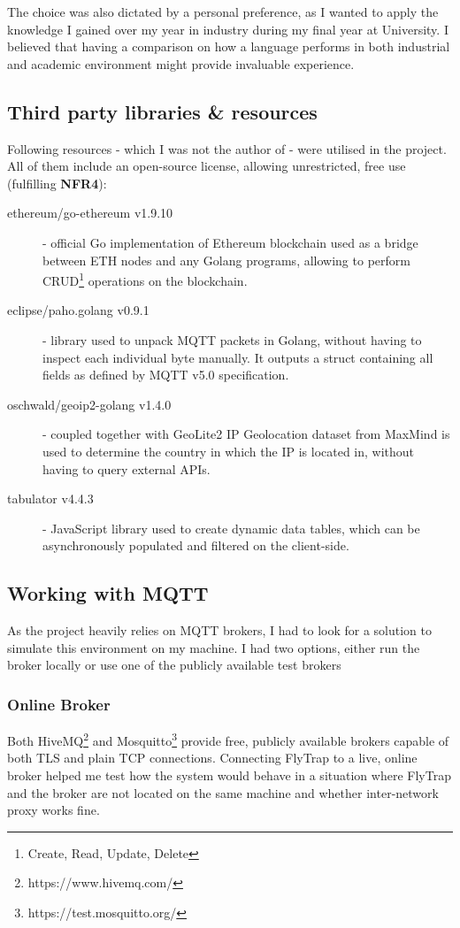 The choice was also dictated by a personal preference, as I wanted to apply the knowledge I gained over my year in industry during my final year at University. I believed that having a comparison on how a language performs in both industrial and academic environment might provide invaluable experience.
\subsection{Third party libraries \& resources}\label{sec:tpp}
Following resources - which I was not the author of - were utilised in the project. All of them include an open-source license, allowing unrestricted, free use (fulfilling \textbf{NFR4}):
\begin{description}
  \item[ethereum/go-ethereum v1.9.10] \cite{ethereum2017official} - official Go implementation of Ethereum blockchain used as a bridge between ETH nodes and any Golang programs, allowing to perform CRUD\footnote{Create, Read, Update, Delete} operations on the blockchain.
    \item[eclipse/paho.golang v0.9.1] \cite{pahogolang} - library used to unpack MQTT packets in Golang, without having to inspect each individual byte manually. It outputs a struct containing all fields as defined by MQTT v5.0 specification.
    \item[oschwald/geoip2-golang v1.4.0] \cite{geoip2} - coupled together with GeoLite2 IP Geolocation dataset from MaxMind \cite{maxmind} is used to determine the country in which the IP is located in, without having to query external APIs. 
    \item[tabulator v4.4.3] \cite{tabulator} - JavaScript library used to create dynamic data tables, which can be asynchronously populated and filtered on the client-side.
\end{description}

\subsection{Working with MQTT}
As the project heavily relies on MQTT brokers, I had to look for a solution to simulate this environment on my machine. I had two  options, either run the broker locally or use one of the publicly available test brokers
\subsubsection{Online Broker}
Both HiveMQ\footnote{https://www.hivemq.com/} and Mosquitto\footnote{https://test.mosquitto.org/} provide free, publicly available brokers capable of both TLS and plain TCP connections. Connecting FlyTrap to a live, online broker helped me test how the system would behave in a situation where FlyTrap and the broker are not located on the same machine and whether inter-network proxy works fine.
